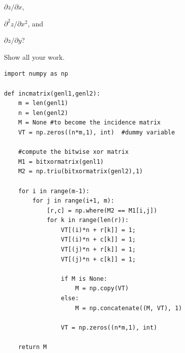 \documentclass[11pt]{article}
\begin{document}
\begin{enumerate}
$\partial z / \partial x$, 

$\partial ^2z / \partial x^2$, and  

$\partial z / \partial y$? 

Show all your work.


\begin{lstlisting}
import numpy as np
    
def incmatrix(genl1,genl2):
    m = len(genl1)
    n = len(genl2)
    M = None #to become the incidence matrix
    VT = np.zeros((n*m,1), int)  #dummy variable
    
    #compute the bitwise xor matrix
    M1 = bitxormatrix(genl1)
    M2 = np.triu(bitxormatrix(genl2),1) 

    for i in range(m-1):
        for j in range(i+1, m):
            [r,c] = np.where(M2 == M1[i,j])
            for k in range(len(r)):
                VT[(i)*n + r[k]] = 1;
                VT[(i)*n + c[k]] = 1;
                VT[(j)*n + r[k]] = 1;
                VT[(j)*n + c[k]] = 1;
                
                if M is None:
                    M = np.copy(VT)
                else:
                    M = np.concatenate((M, VT), 1)
                
                VT = np.zeros((n*m,1), int)
    
    return M
\end{lstlisting}


\end{enumerate}
\end{document}
